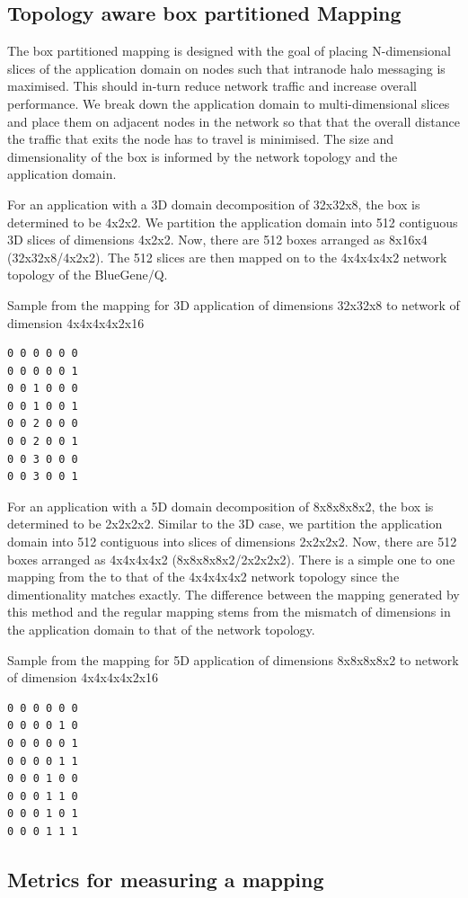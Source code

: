 \documentclass{acm_proc_article-sp}
\begin{document}
\subsection{Topology aware box partitioned Mapping}

The box partitioned mapping is designed with the goal of placing N-dimensional slices of the application domain on nodes such that
intranode halo messaging is maximised. This should in-turn reduce network traffic and increase overall performance.
We break down the application domain to multi-dimensional slices and place them on adjacent nodes in the network so that that the
overall distance the traffic that exits the node has to travel is minimised. The size and dimensionality of the box is informed
by the network topology and the application domain.

For an application with a 3D domain decomposition of 32x32x8, the box is determined to be 4x2x2. We partition the application domain
into 512 contiguous 3D slices of dimensions 4x2x2. Now, there are 512 boxes arranged as 8x16x4 (32x32x8/4x2x2).
The 512 slices are then mapped on to the 4x4x4x4x2 network topology of the BlueGene/Q.

Sample from the mapping for 3D application of dimensions 32x32x8 to network of dimension 4x4x4x4x2x16
\begin{lstlisting}
0 0 0 0 0 0
0 0 0 0 0 1
0 0 1 0 0 0
0 0 1 0 0 1
0 0 2 0 0 0
0 0 2 0 0 1
0 0 3 0 0 0
0 0 3 0 0 1
\end{lstlisting}

For an application with a 5D domain decomposition of 8x8x8x8x2, the box is determined to be 2x2x2x2. Similar to the 3D case, we
partition the application domain into 512 contiguous into  slices of dimensions 2x2x2x2.
Now, there are 512 boxes arranged as 4x4x4x4x2 (8x8x8x8x2/2x2x2x2). There is a simple one to one mapping from the
to that of the 4x4x4x4x2 network topology since the dimentionality matches exactly. The difference between the mapping
generated by this method and the regular mapping stems from the mismatch of dimensions in the application domain to that
of the network topology.

Sample from the mapping for 5D application of dimensions 8x8x8x8x2 to network of dimension 4x4x4x4x2x16
\begin{lstlisting}
0 0 0 0 0 0
0 0 0 0 1 0
0 0 0 0 0 1
0 0 0 0 1 1
0 0 0 1 0 0
0 0 0 1 1 0
0 0 0 1 0 1
0 0 0 1 1 1
\end{lstlisting}

\subsection{Metrics for measuring a mapping}
\end{document}
